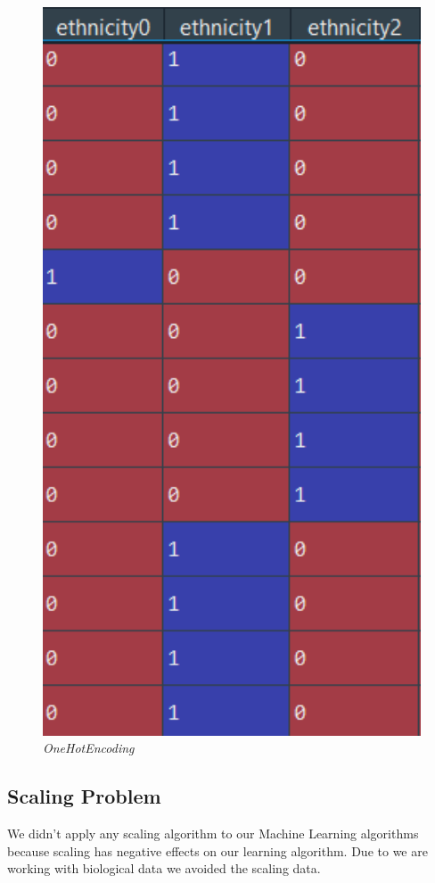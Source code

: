 \documentclass[onecolumn]{article}
\begin{document}
\begin{figure}[h]
\begin{minipage}{0.39\textwidth}
        \includegraphics[width=1.0\textwidth]{after_encoding.png} %
    \end{minipage}
    \bigbreak
    \caption{\emph{OneHotEncoding}}
\end{figure}

\subsection{Scaling Problem}
We didn't apply any scaling algorithm to our Machine Learning algorithms because scaling has negative effects on our learning algorithm. Due to we are working with biological data we avoided the scaling data.
\end{document}
